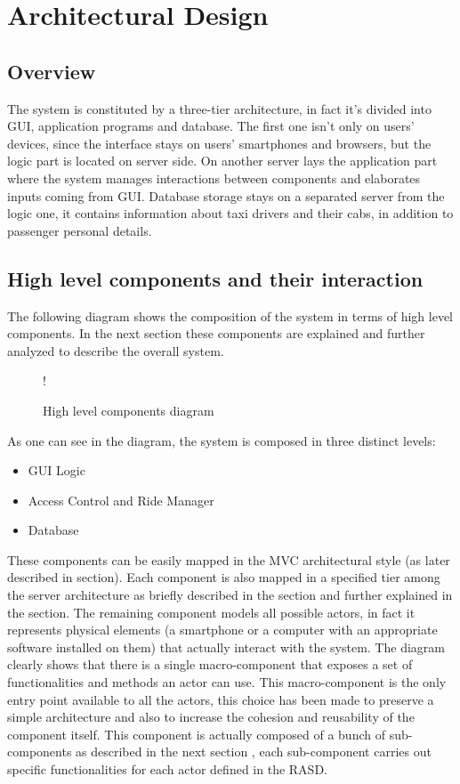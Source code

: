 \section{Architectural Design}
\subsection{Overview}
\label{sec:overview}
The system is constituted by a three-tier architecture, in fact it's divided into GUI, application programs and database. The first one isn't only on users' devices, since the interface stays on users' smartphones and browsers, but the logic part is located on server side. On another server lays the application part where the system manages interactions between components and elaborates inputs coming from GUI. Database storage stays on a separated server from the logic one, it contains information about taxi drivers and their cabs, in addition to passenger personal details.  
\subsection{High level components and their interaction}
\label{sec:high-level}
The following diagram shows the composition of the system in terms of high level components. \newline
In the next section these components are explained and further analyzed to describe the overall system.
\begin{figure}[H]
	\centering
	\resizebox{6in}
	{!}{}
	\caption{High level components diagram}
\end{figure}
As one can see in the diagram, the system is composed in three distinct levels:
\begin{itemize}
	\item GUI Logic
	\item Access Control and Ride Manager
	\item Database
\end{itemize}
These components can be easily mapped in the MVC architectural style (as later described in  section).
Each component is also mapped in a specified tier among the server architecture as briefly described in the  section and further explained in the  section.
The remaining component models all possible actors, in fact it represents physical elements (a smartphone or a computer with an appropriate software installed on them) that actually interact with the system. \newline
The diagram clearly shows that there is a single macro-component that exposes a set of functionalities and methods an actor can use. This macro-component is the only entry point available to all the actors, this choice has been made to preserve a simple architecture and also to increase the cohesion and reusability of the component itself. \newline
This component is actually composed of a bunch of sub-components as described in the next section , each sub-component carries out specific functionalities for each actor defined in the RASD.
